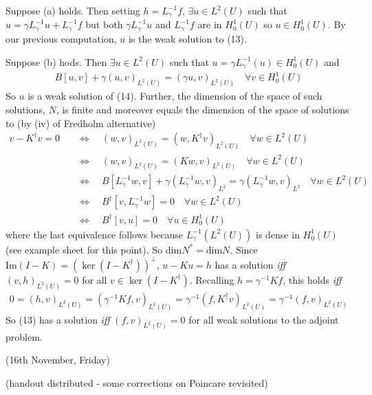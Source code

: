 \documentclass[12pt,a4paper]{report}
\newenvironment{proof}
{\begin{changemargin}{1cm}{0.5cm} 
	}%
	{\end{changemargin}
}
\begin{document}
\begin{proof}
\quad Suppose (a) holds. Then setting $h = L^{-1}_{\gamma} f$, $\exists u \in L^2(U)$ such that $u = \gamma L_{\gamma}^{-1} u + L_{\gamma}^{-1} f$ but both $\gamma L_{\gamma}^{-1} u$ and $L_{\gamma}^{-1} f$ are in $H_0^1(U)$ so $u\in H_0^1(U)$. By our previous computation, $u$ is the weak solution to (13).

\quad Suppose (b) hods. Then $\exists u \in L^2(U)$ such that $u = \gamma L^{-1}_{\gamma}(u) \in H_0^1(U)$ and
\begin{align*}
B[u,v] + \gamma (u,v)_{L^2(U)} = (\gamma u, v)_{L^2(U)} \quad \forall v\in H_0^1(U)
\end{align*}
So $u$ is a weak solution of (14). Further, the dimension of the space of such solutions, $N$, is finite and moreover equals the dimension of the space of solutions to (by (iv) of Fredholm alternative)
\begin{align*}
v - K^{\dagger} v =0 \quad &\Leftrightarrow \quad (w,v)_{L^2(U)} = (w,K^{\dagger}v)_{L^2(U)} \quad \forall w \in L^2(U) \\
& \Leftrightarrow \quad (w,v)_{L^2(U)} = (Kw, v)_{L^2(U)} \quad \forall w \in L^2(U) \\
& \Leftrightarrow \quad B[L_{\gamma}^{-1}w, v] + \gamma (L_{\gamma}^{-1}w, v)_{L^2} = \gamma(L_{\gamma}^{-1}w, v)_{L^2} \quad \forall w \in L^2(U) \\
& \Leftrightarrow \quad B^{\dagger}[v,L_{\gamma}^{-1}w] =0 \quad \forall w \in L^2(U) \\
& \Leftrightarrow \quad B^{\dagger}[v,u] =0 \quad \forall u \in H_0^1(U)
\end{align*}
where the last equivalence follows because $L_{\gamma}^{-1}(L^2(U))$ is dense in $H_0^1(U)$(see example sheet for this point). So $\text{dim} N^* =\text{dim} N$. Since $\text{Im}(I-K) = (\ker (I-K^{\dagger}))^{\perp}$, $u-Ku = h$ has a solution \emph{iff} $(v,h)_{L^2(U)} =0$ for all $v\in \ker(I-K^{\dagger})$. Recalling $h = \gamma^{-1}Kf$, this holds \emph{iff}
\begin{align*}
0 = (h,v)_{L^2(U)} = (\gamma^{-1}Kf, v)_{L^2(U)} = \gamma^{-1}(f, K^{\dagger}v)_{L^2(U)} = \gamma^{-1}(f,v)_{L^2(U)}
\end{align*}
So (13) has a solution \emph{iff} $(f,v)_{L^2(U)}=0$ for all weak solutions to the adjoint problem.

\eop
\end{proof}
\s

\newday

(16th November, Friday)

(handout distributed - some corrections on Poincare revisited)
\s
\end{document}
